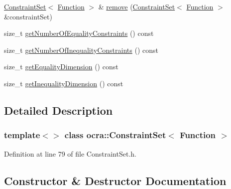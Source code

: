 \begin{DoxyCompactItemize}
\item 
\hyperlink{classocra_1_1ConstraintSet}{Constraint\+Set}$<$ \hyperlink{classocra_1_1Function}{Function} $>$ \& \hyperlink{classocra_1_1ConstraintSet_3_01Function_01_4_a9f745773b26cc27dc2f179392530529f}{remove} (\hyperlink{classocra_1_1ConstraintSet}{Constraint\+Set}$<$ \hyperlink{classocra_1_1Function}{Function} $>$ \&constraint\+Set)
\item 
size\+\_\+t \hyperlink{classocra_1_1ConstraintSet_3_01Function_01_4_a0266bb038c16c77959135d447ace07bd}{get\+Number\+Of\+Equality\+Constraints} () const
\item 
size\+\_\+t \hyperlink{classocra_1_1ConstraintSet_3_01Function_01_4_a61cb359fca1d6cfce9b6ac3b551c7f85}{get\+Number\+Of\+Inequality\+Constraints} () const
\item 
size\+\_\+t \hyperlink{classocra_1_1ConstraintSet_3_01Function_01_4_a28e616efa34ce7f07850557ff3cf96c1}{get\+Equality\+Dimension} () const
\item 
size\+\_\+t \hyperlink{classocra_1_1ConstraintSet_3_01Function_01_4_a3ee3679abafd62c5c860a812da46411c}{get\+Inequality\+Dimension} () const
\end{DoxyCompactItemize}


\subsection{Detailed Description}
\subsubsection*{template$<$$>$\newline
class ocra\+::\+Constraint\+Set$<$ Function $>$}



Definition at line 79 of file Constraint\+Set.\+h.



\subsection{Constructor \& Destructor Documentation}
\hypertarget{classocra_1_1ConstraintSet_3_01Function_01_4_ac79927faf3e3f795670ab85025b1e4a4}{}\label{classocra_1_1ConstraintSet_3_01Function_01_4_ac79927faf3e3f795670ab85025b1e4a4} 
